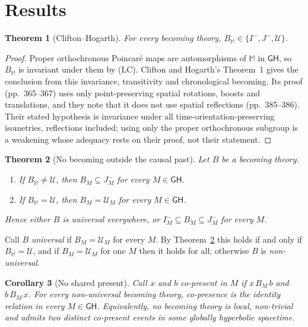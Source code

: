 \documentclass[11pt]{article}
\newtheorem{theorem}{Theorem}
\newtheorem{corollary}[theorem]{Corollary}
\theoremstyle{definition}
\newcommand{\GH}{\mathsf{GH}}
\newcommand{\Mink}{\mathbb M}
\newcommand{\U}{\mathcal U}
\newcommand{\Ichr}{I^{-}}
\newcommand{\Jm}{J^{-}}
\begin{document}
\section{Results}\label{sec:results}

\begin{theorem}[Clifton--Hogarth]\label{thm:flat}
For every becoming theory, $B_\Mink\in\{\Ichr,\Jm,\U\}$.
\end{theorem}

\begin{proof}
Proper orthochronous Poincaré maps are automorphisms of $\Mink$ in $\GH$, so
$B_\Mink$ is invariant under them by (LC). Clifton and Hogarth's Theorem~1
\citep[p.~365]{CH1995} gives the conclusion from this invariance,
transitivity and chronological becoming. Its proof (pp.~365--367) uses only
point-preserving spatial rotations, boosts and translations, and they note
that it does not use spatial reflections (pp.~385--386). Their stated
hypothesis is invariance under all time-orientation-preserving isometries,
reflections included; using only the proper orthochronous subgroup is a
weakening whose adequacy rests on their proof, not their statement.
\end{proof}

\begin{theorem}[No becoming outside the causal past]\label{thm:main}
Let $B$ be a becoming theory.
\begin{enumerate}
\item[(a)] If $B_\Mink\neq\U$, then $B_M\subseteq\Jm_M$ for every $M\in\GH$.
\item[(b)] If $B_\Mink=\U$, then $B_M=\U_M$ for every $M\in\GH$.
\end{enumerate}
Hence either $B$ is universal everywhere, or $\Ichr_M\subseteq
B_M\subseteq\Jm_M$ for every $M$.
\end{theorem}

Call $B$ \emph{universal} if $B_M=\U_M$ for every $M$. By
Theorem~\ref{thm:main} this holds if and only if $B_\Mink=\U$, and if $B_M=\U_M$
for one $M$ then it holds for all; otherwise $B$ is \emph{non-universal}.

\begin{corollary}[No shared present]\label{cor:nopresent}
Call $x$ and $b$ \emph{co-present} in $M$ if $x\,B_M\,b$ and $b\,B_M\,x$. For
every non-universal becoming theory, co-presence is the identity relation in
every $M\in\GH$. Equivalently, no becoming theory is local, non-trivial and
admits two distinct co-present events in some globally hyperbolic spacetime.
\end{corollary}
\end{document}

